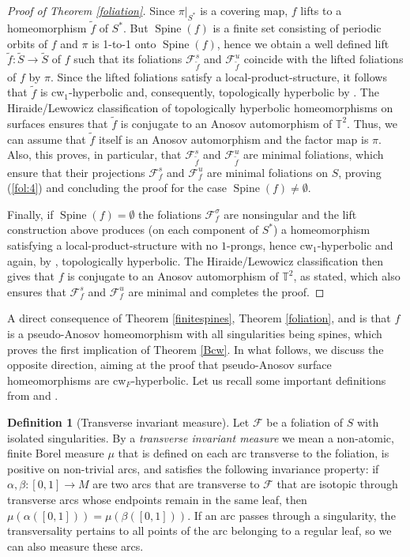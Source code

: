 \documentclass{amsart}
\theoremstyle{plain}
\theoremstyle{definition}
\newtheorem{definition}[theorem]{Definition}
\newcommand{\mc}{\mathcal}
\newcommand{\spine}{\operatorname{Spine}}
\newcommand{\T}{\mathbb{T}}
\begin{document}
\begin{proof}[Proof of Theorem \ref{foliation}]
Since $\pi|_{S^*}$ is a covering map, $f$ lifts to a homeomorphism $\tilde{f}$ of $S^*$.
But $\spine(f)$ is a finite set consisting of periodic orbits of $f$ and $\pi$ is 1-to-1 onto $\spine(f)$, hence we obtain a well defined lift $\widetilde{f}\colon\widetilde{S}\to\widetilde{S}$ of
$f$
such that its foliations $\mc{F}^s_{\widetilde{f}}$ and $\mc{F}^u_{\widetilde{f}}$ coincide with the lifted foliations of $f$ by $\pi$. Since the lifted foliations satisfy a local-product-structure, it follows that $\widetilde{f}$ is cw$_1$-hyperbolic 
and, consequently, topologically hyperbolic by \cite[Theorem~3.1]{ACCV3}. The Hiraide/Lewowicz classification of topologically hyperbolic homeomorphisms on surfaces \cite{H} ensures that $\widetilde{f}$ is conjugate to an Anosov automorphism of $\mathbb{T}^2$. Thus, we can assume that $\tilde f$ itself is an Anosov automorphism and the factor map is $\pi$. Also, this proves, in particular, that $\mc{F}^s_{\widetilde{f}}$ and $\mc{F}^u_{\widetilde{f}}$ are minimal foliations, which ensure that their projections $\mc{F}^s_f$ and $\mc{F}^u_f$ are minimal foliations on $S$, proving (\ref{fol:4}) and concluding the proof for the case $\spine(f)\neq \emptyset$.

Finally, if $\spine(f)=\emptyset$ the foliations $\mc{F}^\sigma_f$ are nonsingular and the lift
construction above produces (on each component of $S^*$) a homeomorphism satisfying a
local-product-structure with no $1$-prongs, hence cw$_1$-hyperbolic and again, by
\cite[Theorem~3.1]{ACCV3}, topologically hyperbolic. The Hiraide/Lewowicz classification then
gives that $f$ is conjugate to an Anosov automorphism of $\T^2$, as stated, which also ensures that $\mc{F}^s_f$ and $\mc{F}^u_f$ are minimal and completes the proof. 
\end{proof}

A direct consequence of Theorem \ref{finitespines}, Theorem \ref{foliation}, and \cite[Proposition B]{H} is that $f$ is a pseudo-Anosov homeomorphism with all singularities being spines, which proves the first implication of Theorem \ref{Bcw}.  In what follows, we discuss the opposite direction, aiming at the proof that pseudo-Anosov surface homeomorphisms are cw$_F$-hyperbolic.
Let us recall some important definitions from \cite{BC} and \cite{FLPKM}. 

\begin{definition}[Transverse invariant measure] Let $\mc{F}$ be a foliation of $S$ with isolated singularities. By a \textit{transverse invariant measure} we mean a non-atomic, finite Borel measure $\mu$ that is defined on each arc transverse to the foliation, is positive on non-trivial arcs, and satisfies the following invariance property: if $\alpha,\beta\colon [0, 1] \to M$ are two arcs that are transverse to $\mc{F}$ that
are isotopic through transverse arcs whose endpoints remain in the
same leaf, then $\mu(\alpha([0,1])) = \mu(\beta([0,1]))$. If an arc passes through a singularity, the transversality pertains to all points of the arc belonging to a regular leaf, so we can also measure these arcs.
\end{definition}
\end{document}
